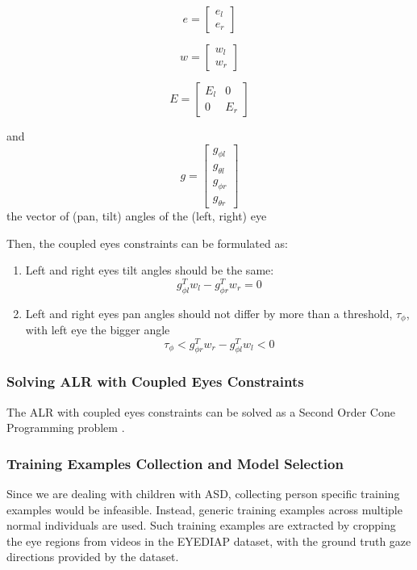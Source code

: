 \documentclass{ut-thesis}
\begin{document}
\[  e = \begin{bmatrix}
e_l \\ e_r
\end{bmatrix}   \]

\[  w = \begin{bmatrix}
w_l \\ w_r
\end{bmatrix}   \]

\[  E = \begin{bmatrix}
E_l	&	0 \\
0	&	E_r
\end{bmatrix}  \]

and \[g = \begin{bmatrix}
g_{\phi l} \\ g_{\theta l} \\ g_{\phi r} \\ g_{\theta r}
\end{bmatrix}  \]
the vector of (pan, tilt) angles of the (left, right) eye

Then, the coupled eyes constraints can be formulated as: 
\begin{enumerate}
	\item Left and right eyes tilt angles should be the same:
	\[ g_{\phi l}^T w_l -  g_{\phi r}^T w_r = 0 \]

	\item Left and right eyes pan angles should not differ by more than a threshold, \(\tau_\phi\), with left eye the bigger angle
	\[  \tau_\phi < g_{\phi r}^T w_r - g_{\phi l}^T w_l < 0 \]
\end{enumerate}


\subsubsection{Solving ALR with Coupled Eyes Constraints}
The ALR with coupled eyes constraints can be solved as a Second Order Cone Programming problem \cite{funes2013person, kim2001second}.


\subsubsection{Training Examples Collection and Model Selection}
Since we are dealing with children with ASD, collecting person specific training examples would be infeasible.  Instead, generic training examples across multiple normal individuals are used.  Such training examples are extracted by cropping the eye regions from videos in the EYEDIAP dataset, with the ground truth gaze directions provided by the dataset.
\end{document}
